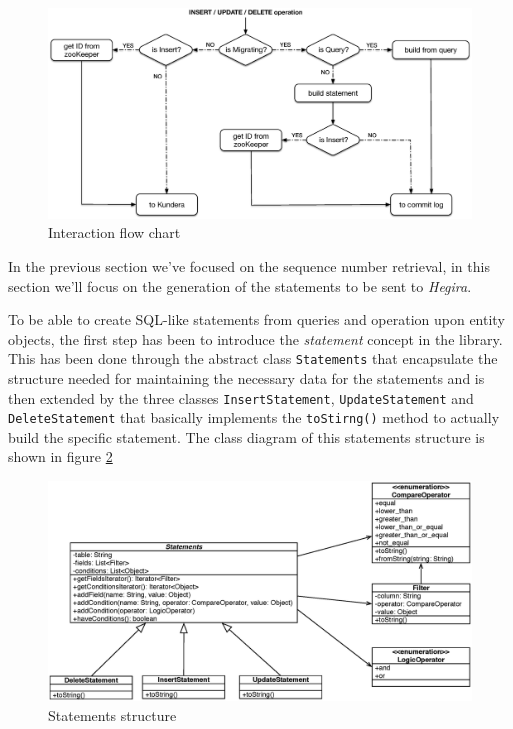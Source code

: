 \begin{figure}[tbh]
  \centering
  \includegraphics[width=13.5cm]{images/flow_chart}
  \caption{Interaction flow chart}
  \label{fig:flow-chart}
\end{figure} 

\noindent In the previous section we've focused on the sequence number retrieval, in this section we'll focus on the generation of the statements to be sent to \textit{Hegira}.

\newparagraph To be able to create SQL-like statements from queries and operation upon entity objects, the first step has been to introduce the \textit{statement} concept in the library. This has been done through the abstract class \texttt{Statements} that encapsulate the structure needed for maintaining the necessary data for the statements and is  then extended by the three classes \texttt{InsertStatement}, \texttt{UpdateStatement} and \texttt{DeleteStatement} that basically implements the \texttt{toStirng()} method to actually build the specific statement.
The class diagram of this statements structure is shown in figure \ref{fig:statements}

\begin{figure}[tbh]
  \centering
  \includegraphics[width=13cm]{images/statements}
  \caption{Statements structure}
  \label{fig:statements}
\end{figure} 

